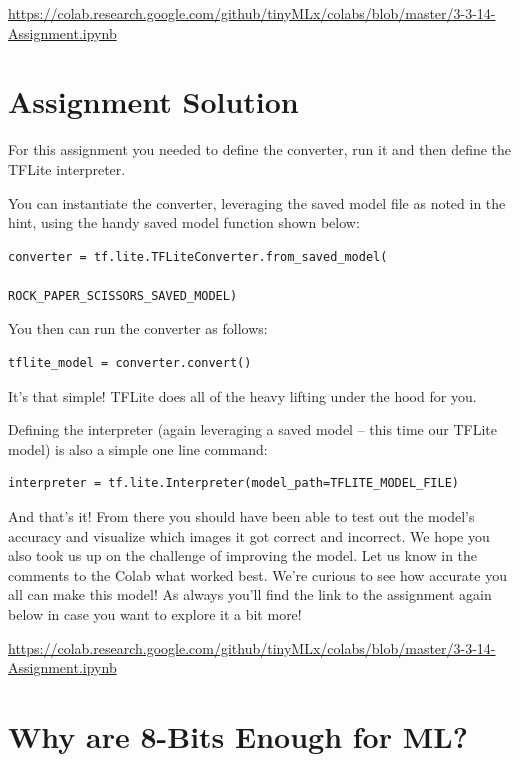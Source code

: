 \url{https://colab.research.google.com/github/tinyMLx/colabs/blob/master/3-3-14-Assignment.ipynb}

\section{Assignment Solution}

For this assignment you needed to define the converter, run it and then define the TFLite interpreter.

You can instantiate the converter, leveraging the saved model file as noted in the hint, using the handy saved model function shown below:

\begin{lstlisting}
converter = tf.lite.TFLiteConverter.from_saved_model(

ROCK_PAPER_SCISSORS_SAVED_MODEL)
\end{lstlisting}


You then can run the converter as follows:

\begin{lstlisting}
tflite_model = converter.convert()
\end{lstlisting}

It's that simple! TFLite does all of the heavy lifting under the hood for you.

Defining the interpreter (again leveraging a saved model -- this time our TFLite model) is also a simple one line command:

\begin{lstlisting}
interpreter = tf.lite.Interpreter(model_path=TFLITE_MODEL_FILE)
\end{lstlisting}

And that's it! From there you should have been able to test out the model's accuracy and visualize which images it got correct and incorrect. We hope you also took us up on the challenge of improving the model. Let us know in the comments to the Colab what worked best. We’re curious to see how accurate you all can make this model! As always you’ll find the link to the assignment again below in case you want to explore it a bit more!

\url{https://colab.research.google.com/github/tinyMLx/colabs/blob/master/3-3-14-Assignment.ipynb}


\section{Why are 8-Bits Enough for ML?}

